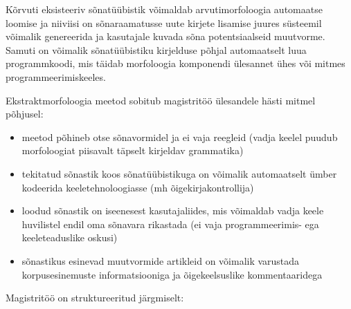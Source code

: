 \documentclass[12pt,a4paper]{article}
\begin{document}
Kõrvuti eksisteeriv sõnatüübistik võimaldab arvutimorfoloogia automaatse loomise ja niiviisi on sõnaraamatusse uute kirjete lisamise juures süsteemil võimalik genereerida ja kasutajale kuvada sõna potentsiaalseid muutvorme. Samuti on võimalik sõnatüübistiku kirjelduse põhjal automaatselt luua programm\-koodi, mis täidab morfoloogia komponendi ülesannet ühes või mitmes programmeerimis\-keeles.

Ekstraktmorfoloogia meetod sobitub magistritöö ülesandele hästi mitmel põhjusel:
\begin{itemize}
\item meetod põhineb otse sõnavormidel ja ei vaja reegleid (vadja keelel puudub morfoloogiat piisavalt täpselt kirjeldav grammatika)
\item tekitatud sõnastik koos sõnatüübistikuga on võimalik automaatselt ümber kodeerida keeletehnoloogiasse (mh õigekirjakontrollija)
\item loodud sõnastik on iseenesest kasutajaliides, mis võimaldab vadja keele huvilistel endil oma sõnavara rikastada (ei vaja programmeerimis- ega keeleteaduslike oskusi)
\item sõnastikus esinevad muutvormide artikleid on võimalik varustada korpusesinemuste informatsiooniga ja õigekeelsuslike kommentaaridega
\end{itemize}


Magistritöö on struktureeritud järgmiselt:
\end{document}
